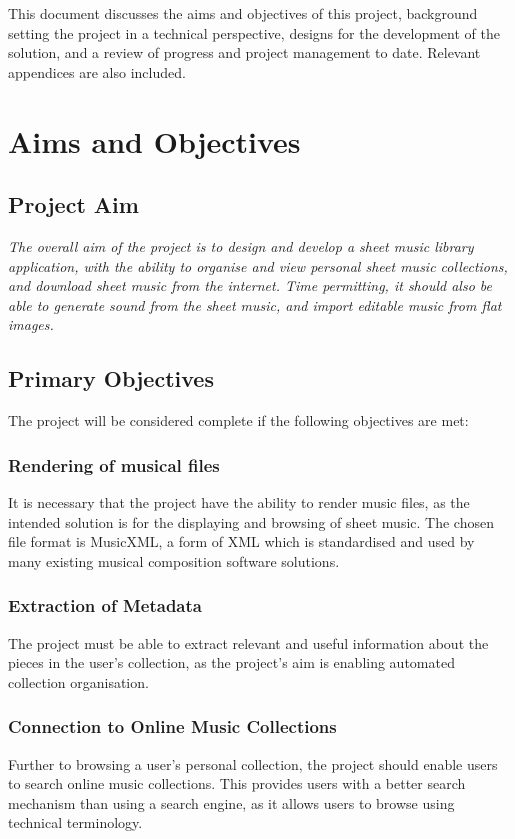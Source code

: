 This document discusses the aims and objectives of this project, background setting the project in a technical perspective, designs for the development of the solution, and a review of progress and project management to date. Relevant appendices are also included.
\pagebreak
\section{Aims and Objectives}
\subsection{Project Aim}
\begin{center}
\textit{The overall aim of the project is to design and develop a sheet music library application, with the ability to organise and view personal sheet music collections, and download sheet music from the internet. Time permitting, it should also be able to generate sound from the sheet music, and import editable music from flat images.}
\end{center}
\subsection{Primary Objectives}
The project will be considered complete if the following objectives are met:
\subsubsection{Rendering of musical files}
It is necessary that the project have the ability to render music files, as the intended solution is for the displaying and browsing of sheet music. The chosen file format is MusicXML, a form of XML which is standardised and used by many existing musical composition software solutions.
\subsubsection{Extraction of Metadata}
The project must be able to extract relevant and useful information about the pieces in the user's collection, as the project's aim is enabling automated collection organisation. 
\subsubsection{Connection to Online Music Collections}
Further to browsing a user's personal collection, the project should enable users to search online music collections. This provides users with a better search mechanism than using a search engine, as it allows users to browse using technical terminology.
